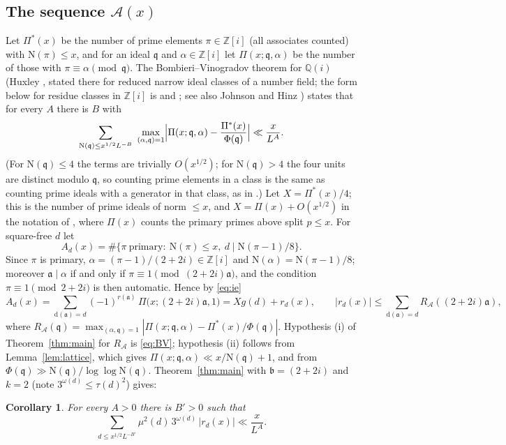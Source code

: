 \documentclass[11pt]{amsart}
\newtheorem{corollary}[theorem]{Corollary}
\theoremstyle{remark}
\newcommand{\Z}{\mathbb{Z}}
\newcommand{\Q}{\mathbb{Q}}
\newcommand{\N}{\mathrm{N}}
\newcommand{\fa}{\mathfrak{a}}
\newcommand{\fb}{\mathfrak{b}}
\newcommand{\fq}{\mathfrak{q}}
\newcommand{\dd}{\mathrm{d}}
\begin{document}
\subsection{The sequence $\mathcal A(x)$}
Let $\Pi^*(x)$ be the number of prime elements $\pi\in\Z[i]$ (all associates counted) with $\N(\pi)\le x$, and for an ideal $\fq$ and $\alpha\in\Z[i]$ let $\Pi(x;\fq,\alpha)$ be the number of those with $\pi\equiv\alpha\pmod\fq$. The Bombieri--Vinogradov theorem for $\Q(i)$ (Huxley \cite[Theorem~1]{Hux71}, stated there for reduced narrow ideal classes of a number field; the form below for residue classes in $\Z[i]$ is \cite[Proposition~2.2]{Xie} and \cite[Proposition~3.2]{IJU}; see also Johnson \cite[Corollary]{Joh} and Hinz \cite{Hinz}) states that for every $A$ there is $B$ with
\begin{equation}\label{eq:BV}
\sum_{\N(\fq)\le x^{1/2}L^{-B}}\ \max_{(\alpha,\fq)=1}\Bigl|\Pi(x;\fq,\alpha)-\frac{\Pi^*(x)}{\Phi(\fq)}\Bigr|\ll\frac{x}{L^{A}}.
\end{equation}
(For $\N(\fq)\le 4$ the terms are trivially $O(x^{1/2})$; for $\N(\fq)>4$ the four units are distinct modulo $\fq$, so counting prime elements in a class is the same as counting prime ideals with a generator in that class, as in \cite[Proposition~2.2]{Xie}.)
Let $X=\Pi^*(x)/4$; this is the number of prime ideals of norm $\le x$, and $X=\Pi(x)+O(x^{1/2})$ in the notation of \cite{IJU}, where $\Pi(x)$ counts the primary primes above split $p\le x$. For square-free $d$ let
\[
A_d(x)=\#\{\pi\ \text{primary}:\ \N(\pi)\le x,\ d\mid \N(\pi-1)/8\}.
\]
Since $\pi$ is primary, $\alpha=(\pi-1)/(2+2i)\in\Z[i]$ and $\N(\alpha)=\N(\pi-1)/8$; moreover $\fa\mid\alpha$ if and only if $\pi\equiv 1\pmod{(2+2i)\fa}$, and the condition $\pi\equiv1\pmod{2+2i}$ is then automatic. Hence by \eqref{eq:ie}
\[
A_d(x)=\sum_{\dd(\fa)=d}(-1)^{r(\fa)}\,\Pi\bigl(x;(2+2i)\fa,1\bigr)=X g(d)+r_d(x),\qquad |r_d(x)|\le\sum_{\dd(\fa)=d}R_{\mathcal A}((2+2i)\fa),
\]
where $R_{\mathcal A}(\fq)=\max_{(\alpha,\fq)=1}|\Pi(x;\fq,\alpha)-\Pi^*(x)/\Phi(\fq)|$. Hypothesis (i) of Theorem~\ref{thm:main} for $R_{\mathcal A}$ is \eqref{eq:BV}; hypothesis (ii) follows from Lemma~\ref{lem:lattice}, which gives $\Pi(x;\fq,\alpha)\ll x/\N(\fq)+1$, and from $\Phi(\fq)\gg\N(\fq)/\log\log\N(\fq)$. Theorem~\ref{thm:main} with $\fb=(2+2i)$ and $k=2$ (note $3^{\omega(d)}\le\tau(d)^2$) gives:

\begin{corollary}\label{cor:A}
For every $A>0$ there is $B'>0$ such that
\[
\sum_{d\le x^{1/2}L^{-B'}}\mu^2(d)\,3^{\omega(d)}\,|r_d(x)|\ll\frac{x}{L^{A}}.
\]
\end{corollary}
\end{document}
